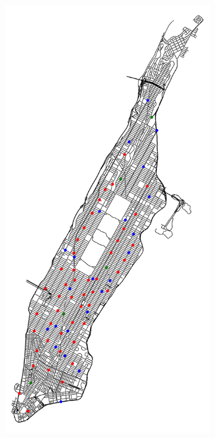 \begin{figure}[t]
	\centering
	\begin{subfigure}[b]{0.35\textwidth}
		\centering
		\includegraphics[width=\textwidth]{assets/img/07_graph_based/new_york_vanilla_info.png}

\end{subfigure}
\end{figure}

